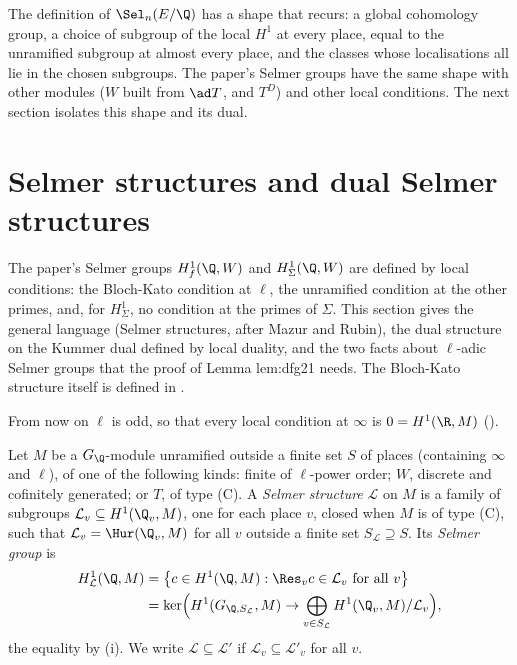 The definition of $\Sel_n(E/\Q)$ has a shape that recurs: a global cohomology group, a choice of subgroup of the local $H^1$ at every place, equal to the unramified
subgroup at almost every place, and the classes whose localisations all lie in the chosen subgroups. The paper's Selmer groups have the same shape with other
modules ($W$ built from $\ad T$, and $T^D$) and other local conditions. The next section isolates this shape and its dual.
\section{Selmer structures and dual Selmer structures}\label{sec:galcoh:structures}

The paper's Selmer groups $H^1_f(\Q,W)$ and $H^1_\Sigma(\Q,W)$ are defined by local conditions: the Bloch-Kato condition at $\ell$, the unramified condition at the
other primes, and, for $H^1_\Sigma$, no condition at the primes of $\Sigma$. This section gives the general language (Selmer structures, after Mazur and Rubin), the
dual structure on the Kummer dual defined by local duality, and the two facts about $\ell$-adic Selmer groups that the proof of Lemma lem:dfg21 needs. The
Bloch-Kato structure itself is defined in .

From now on $\ell$ is odd, so that every local condition at $\infty$ is $0=H^1(\R,M)$ ().

\begin{definition}\label{def:galcoh:selmer-structure}
Let $M$ be a $G_\Q$-module unramified outside a finite set $S$ of places (containing $\infty$ and $\ell$), of one of the following kinds: finite of $\ell$-power order; $W$,
discrete and cofinitely generated; or $T$, of type (C). A \emph{Selmer structure} $\mathcal L$ on $M$ is a family of subgroups $\mathcal L_v\subseteq H^1(\Q_v,M)$, one for each place
$v$, closed when $M$ is of type (C), such that $\mathcal L_v=\Hur(\Q_v,M)$ for all $v$ outside a finite set $S_{\mathcal L}\supseteq S$. Its \emph{Selmer group} is
\begin{align*}
H^1_{\mathcal L}(\Q,M)&=\bigl\{c\in H^1(\Q,M):\Res_vc\in\mathcal L_v\text{ for all }v\bigr\}\\
&=\ker\Bigl(H^1(G_{\Q,S_{\mathcal L}},M)\to\bigoplus_{v\in S_{\mathcal L}}H^1(\Q_v,M)/\mathcal L_v\Bigr),
\end{align*}
the equality by (i). We write $\mathcal L\subseteq\mathcal L'$ if $\mathcal L_v\subseteq\mathcal L'_v$ for all $v$.
\end{definition}

